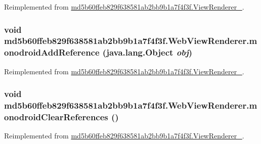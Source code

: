 Reimplemented from \hyperlink{classmd5b60ffeb829f638581ab2bb9b1a7f4f3f_1_1_view_renderer__2_a0898cf56fa9a49b653470eaf1608e77}{md5b60ffeb829f638581ab2bb9b1a7f4f3f.ViewRenderer\_}.\hypertarget{classmd5b60ffeb829f638581ab2bb9b1a7f4f3f_1_1_web_view_renderer_395da0b1470b8a8d7fe3d8f11678dd44}{
\subsubsection[{monodroidAddReference}]{\setlength{\rightskip}{0pt plus 5cm}void md5b60ffeb829f638581ab2bb9b1a7f4f3f.WebViewRenderer.monodroidAddReference (java.lang.Object {\em obj})}}
\label{classmd5b60ffeb829f638581ab2bb9b1a7f4f3f_1_1_web_view_renderer_395da0b1470b8a8d7fe3d8f11678dd44}




Reimplemented from \hyperlink{classmd5b60ffeb829f638581ab2bb9b1a7f4f3f_1_1_view_renderer__2_64ca8244a89f60a47c173d9c0b15d610}{md5b60ffeb829f638581ab2bb9b1a7f4f3f.ViewRenderer\_}.\hypertarget{classmd5b60ffeb829f638581ab2bb9b1a7f4f3f_1_1_web_view_renderer_554c17e18aeffc2dcd3b9899551fd449}{
\subsubsection[{monodroidClearReferences}]{\setlength{\rightskip}{0pt plus 5cm}void md5b60ffeb829f638581ab2bb9b1a7f4f3f.WebViewRenderer.monodroidClearReferences ()}}
\label{classmd5b60ffeb829f638581ab2bb9b1a7f4f3f_1_1_web_view_renderer_554c17e18aeffc2dcd3b9899551fd449}




Reimplemented from \hyperlink{classmd5b60ffeb829f638581ab2bb9b1a7f4f3f_1_1_view_renderer__2_dae20979ac761a65aa60c9b427509c37}{md5b60ffeb829f638581ab2bb9b1a7f4f3f.ViewRenderer\_}.

